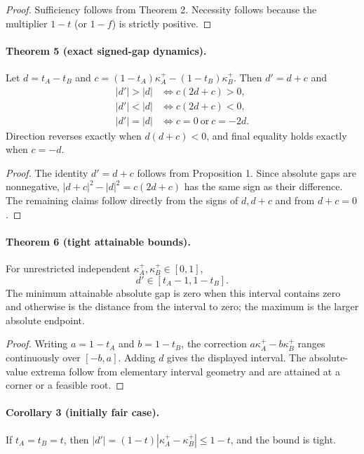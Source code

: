 \begin{proof}
Sufficiency follows from Theorem 2.  Necessity follows because the multiplier
$1-t$ (or $1-f$) is strictly positive.
\end{proof}

\paragraph{Theorem 5 (exact signed-gap dynamics).}
Let $d=t_A-t_B$ and
$c=(1-t_A)\kappa_A^+-(1-t_B)\kappa_B^+$.  Then $d'=d+c$ and
\begin{align*}
|d'|>|d|&\iff c(2d+c)>0,\\
|d'|<|d|&\iff c(2d+c)<0,\\
|d'|=|d|&\iff c=0\ \text{or}\ c=-2d.
\end{align*}
Direction reverses exactly when $d(d+c)<0$, and final equality holds exactly
when $c=-d$.

\begin{proof}
The identity $d'=d+c$ follows from Proposition 1.  Since absolute gaps are
nonnegative,
$|d+c|^2-|d|^2=c(2d+c)$ has the same sign as their difference.  The remaining
claims follow directly from the signs of $d,d+c$ and from $d+c=0$.
\end{proof}

\paragraph{Theorem 6 (tight attainable bounds).}
For unrestricted independent $\kappa_A^+,\kappa_B^+\in[0,1]$,
\[
d'\in[t_A-1,1-t_B].
\]
The minimum attainable absolute gap is zero when this interval contains zero
and otherwise is the distance from the interval to zero; the maximum is the
larger absolute endpoint.

\begin{proof}
Writing $a=1-t_A$ and $b=1-t_B$, the correction $a\kappa_A^+-b\kappa_B^+$
ranges continuously over $[-b,a]$.  Adding $d$ gives the displayed interval.
The absolute-value extrema follow from elementary interval geometry and are
attained at a corner or a feasible root.
\end{proof}

\paragraph{Corollary 3 (initially fair case).}
If $t_A=t_B=t$, then
$|d'|=(1-t)|\kappa_A^+-\kappa_B^+|\le1-t$, and the bound is tight.

